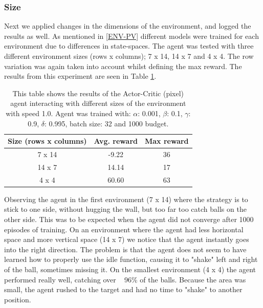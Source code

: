 \documentclass{article}
\begin{document}
\subsubsection{Size}
Next we applied changes in the dimensions of the environment, and logged the results as well.
As mentioned in \ref{ENV-PV} different models were trained for each environment due to differences in state-spaces. 
The agent was tested with three different environment sizes (rows x columns); 7 x 14, 14 x 7 and 4 x 4. 
The row variation was again taken into account whilst defining the max reward. 
The results from this experiment are seen in Table \ref{tab:Pixel-size}.

\begin{table}[]
    \centering
    \begin{tabular}{|c|c|c|}
        \hline
        \textbf{Size (rows x columns)} & \textbf{Avg. reward} & \textbf{Max reward} \\
        \hline
        7 x 14                & -9.22       & 36                  \\
        14 x 7                & 14.14       & 17                  \\
        4 x 4                 & 60.60       & 63                    \\
        \hline
    \end{tabular}
    \caption{This table shows the results of the Actor-Critic (pixel) agent interacting with different sizes of the environment with speed 1.0. 
    Agent was trained with: $\alpha$: 0.001, $\beta$: 0.1, $\gamma$: 0.9, $\delta$: 0.995, batch size: 32 and 1000 budget. }
    \label{tab:Pixel-size}
\end{table}

Observing the agent in the first environment (7 x 14)  where the strategy is to stick to one side, without hugging the wall, but too far too catch balls on the other side. 
This was to be expected when the agent did not converge after 1000 episodes of training. 
On an environment where the agent had less horizontal space and more vertical space (14 x 7) we notice that the agent instantly goes into the right direction.
The problem is that the agent does not seem to have learned how to properly use the idle function, causing it to "shake" left and right of the ball, sometimes missing it. 
On the smallest environment (4 x 4) the agent performed really well, catching over ~ 96\% of the balls.
Because the area was small, the agent rushed to the target and had no time to "shake" to another position.
\end{document}
